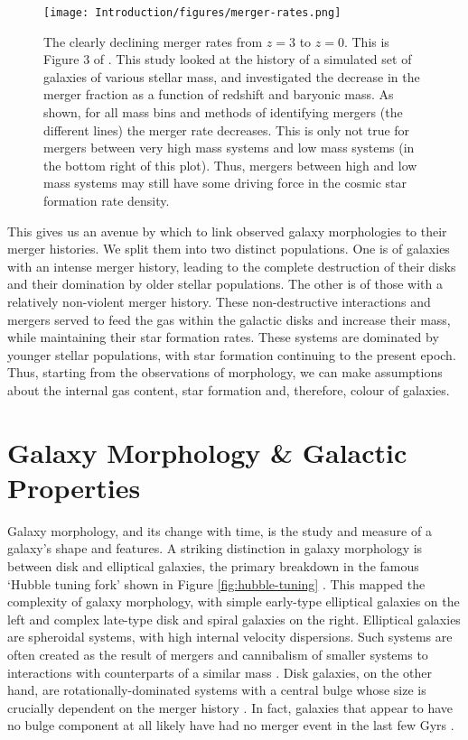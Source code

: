 \begin{figure}
\centering
\texttt{[image: Introduction/figures/merger-rates.png]}
\caption[The declining merger rates from z = 3 to z = 0.]{The clearly declining merger rates from $z = 3$ to $z = 0$. This is Figure 3 of \citet{2010ApJ...715..202H}. This study looked at the history of a simulated set of galaxies of various stellar mass, and investigated the decrease in the merger fraction as a function of redshift and baryonic mass. As shown, for all mass bins and methods of identifying mergers (the different lines) the merger rate decreases. This is only not true for mergers between very high mass systems and low mass systems (in the bottom right of this plot). Thus, mergers between high and low mass systems may still have some driving force in the cosmic star formation rate density.}
\label{fig:merger-rate}
\end{figure}

This gives us an avenue by which to link observed galaxy morphologies to their merger histories. We split them into two distinct populations. One is of galaxies with an intense merger history, leading to the complete destruction of their disks and their domination by older stellar populations. The other is of those with a relatively non-violent merger history. These non-destructive interactions and mergers served to feed the gas within the galactic disks and increase their mass, while maintaining their star formation rates. These systems are dominated by younger stellar populations, with star formation continuing to the present epoch. Thus, starting from the observations of morphology, we can make assumptions about the internal gas content, star formation and, therefore, colour of galaxies.

\section{Galaxy Morphology \& Galactic Properties}\label{galaxy-morphology}
\noindent Galaxy morphology, and its change with time, is the study and measure of a galaxy's shape and features. A striking distinction in galaxy morphology is between disk and elliptical galaxies, the primary breakdown in the famous `Hubble tuning fork' shown in Figure \ref{fig:hubble-tuning} \citep{1936rene.book.....H}. This mapped the complexity of galaxy morphology, with simple early-type elliptical galaxies on the left and complex late-type disk and spiral galaxies on the right. Elliptical galaxies are spheroidal systems, with high internal velocity dispersions. Such systems are often created as the result of mergers and cannibalism of smaller systems to interactions with counterparts of a similar mass \citep{1996MNRAS.283.1361B, 2006MNRAS.366..499D}. Disk galaxies, on the other hand, are rotationally-dominated systems with a central bulge whose size is crucially dependent on the merger history \citep{1992ApJ...393..484B, 2010ApJ...715..202H, 2017ApJ...837L...8B}. In fact, galaxies that appear to have no bulge component at all likely have had no merger event in the last few Gyrs \citep{2012ApJ...756...26M}.

